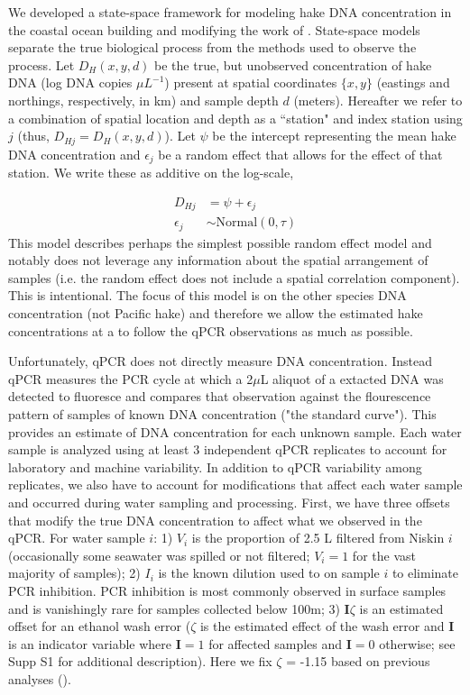 \documentclass{article}
\begin{document}
We developed a state-space framework for modeling hake DNA concentration in the coastal ocean building and modifying the work of \cite{shelton2022}.  State-space models separate the true biological process from the methods used to observe the process. Let $D_H(x,y,d)$ be the true, but unobserved concentration of hake DNA (log DNA copies $\mu L^{-1}$) present at spatial coordinates $\{x,y\}$ (eastings and northings, respectively, in km) and sample depth $d$ (meters). Hereafter we refer to a combination of spatial location and depth as a ``station" and index station using $j$ (thus, $D_{Hj} = D_H(x,y,d)$). Let $\psi$ be the intercept representing the mean hake DNA concentration and $\epsilon_j$ be a random effect that allows for the effect of that station. We write these as additive on the log-scale,

\begin{align}
  D_{Hj} &= \psi + \epsilon_j \\
  \epsilon_j &\sim  \mathrm{Normal}(0,\tau)
\end{align}
This model describes perhaps the simplest possible random effect model and notably does not leverage any information about the spatial arrangement of samples (i.e. the random effect does not include a spatial correlation component).  This is intentional.  The focus of this model is on the other species DNA concentration (not Pacific hake) and therefore we allow the estimated hake concentrations at a to follow the qPCR observations as much as possible. 

Unfortunately, qPCR does not directly measure DNA concentration. Instead qPCR measures the PCR cycle at which a 2$\mu$L aliquot of a extacted DNA was detected to fluoresce and compares that observation against the flourescence pattern of samples of known DNA concentration ("the standard curve"). This provides an estimate of DNA concentration for each unknown sample. Each water sample is analyzed using at least 3 independent qPCR replicates to account for laboratory and machine variability. In addition to qPCR variability among replicates, we also have to account for modifications that affect each water sample and occurred during water sampling and processing. First, we have three offsets that modify the true DNA concentration to affect what we observed in the qPCR. For water sample $i$: 1) $V_i$ is the proportion of 2.5 L filtered from Niskin $i$ (occasionally some seawater was spilled or not filtered; $V_i =1$ for the vast majority of samples); 2) $I_i$ is the known dilution used to on sample $i$ to eliminate PCR inhibition. PCR inhibition is most commonly observed in surface samples and is vanishingly rare for samples collected below 100m; 3) $\mathbf{I}\zeta$ is an estimated offset for an ethanol wash error ($\zeta$ is the estimated effect of the wash error and $\mathbf{I}$ is an indicator variable where $\mathbf{I}=1$ for affected samples and $\mathbf{I}=0$ otherwise; see \cite{shelton2022} Supp S1 for additional description). Here we fix $\zeta$ = -1.15 based on previous analyses (\cite{shelton2022}).
\end{document}
